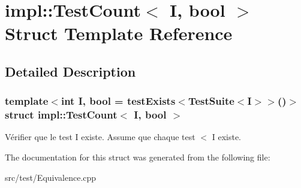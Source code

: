 \hypertarget{structimpl_1_1TestCount}{}\section{impl\+:\+:Test\+Count$<$ I, bool $>$ Struct Template Reference}
\label{structimpl_1_1TestCount}


\subsection{Detailed Description}
\subsubsection*{template$<$int I, bool = test\+Exists$<$\+Test\+Suite$<$\+I$>$$>$()$>$\newline
struct impl\+::\+Test\+Count$<$ I, bool $>$}

Vérifier que le test I existe. Assume que chaque test $<$ I existe. 

The documentation for this struct was generated from the following file\+:\begin{DoxyCompactItemize}
\item 
src/test/Equivalence.\+cpp\end{DoxyCompactItemize}
